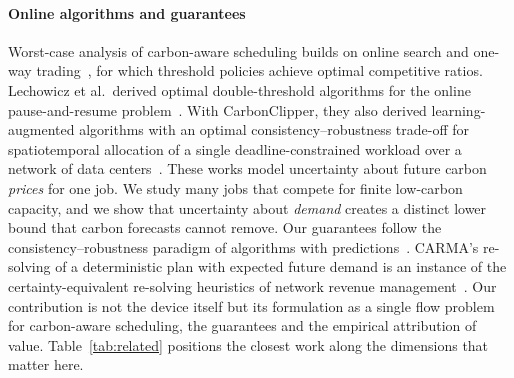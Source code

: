 \paragraph{Online algorithms and guarantees} Worst-case analysis of carbon-aware scheduling builds on online search and one-way trading~\cite{elyaniv2001optimal}, for which threshold policies achieve optimal competitive ratios. Lechowicz et al.\ derived optimal double-threshold algorithms for the online pause-and-resume problem~\cite{lechowicz2023online}. With CarbonClipper, they also derived learning-augmented algorithms with an optimal consistency--robustness trade-off for spatiotemporal allocation of a single deadline-constrained workload over a network of data centers~\cite{lechowicz2025learning}. These works model uncertainty about future carbon \emph{prices} for one job. We study many jobs that compete for finite low-carbon capacity, and we show that uncertainty about \emph{demand} creates a distinct lower bound that carbon forecasts cannot remove. Our guarantees follow the consistency--robustness paradigm of algorithms with predictions~\cite{lykouris2021competitive}. CARMA's re-solving of a deterministic plan with expected future demand is an instance of the certainty-equivalent re-solving heuristics of network revenue management~\cite{jasin2012resolving}. Our contribution is not the device itself but its formulation as a single flow problem for carbon-aware scheduling, the guarantees and the empirical attribution of value. Table~\ref{tab:related} positions the closest work along the dimensions that matter here.

